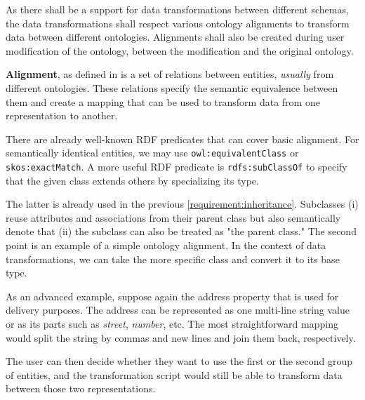 \begin{requirement}
    As there shall be a support for data transformations between different schemas, the data transformations shall respect various ontology alignments to transform data between different ontologies. Alignments shall also be created during user modification of the ontology, between the modification and the original ontology.
    \label{requirement:ontology-alignments}
\end{requirement}

\textbf{Alignment}, as defined in \cite{euzenat_ontology_2013} is a set of relations between entities, \textit{usually} from different ontologies. These relations specify the semantic equivalence between them and create a mapping that can be used to transform data from one representation to another.

There are already well-known RDF predicates that can cover basic alignment. For semantically identical entities, we may use \verb|owl:equivalentClass| or \verb|skos:exactMatch|. A more useful RDF predicate is \verb|rdfs:subClassOf| to specify that the given class extends others by specializing its type.

The latter is already used in the previous \autoref{requirement:inheritance}. Subclasses (i) reuse attributes and associations from their parent class but also semantically denote that (ii) the subclass can also be treated as "the parent class." The second point is an example of a simple ontology alignment. In the context of data transformations, we can take the more specific class and convert it to its base type.

\medskip

As an advanced example, suppose again the address property that is used for delivery purposes. The address can be represented as one multi-line string value or as its parts such as \textit{street}, \textit{number}, etc. The most straightforward mapping would split the string by commas and new lines and join them back, respectively.

The user can then decide whether they want to use the first or the second group of entities, and the transformation script would still be able to transform data between those two representations.

